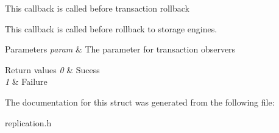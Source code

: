 This callback is called before transaction rollback

This callback is called before rollback to storage engines.


\begin{DoxyParams}{Parameters}
{\em param} & The parameter for transaction observers\\
\hline
\end{DoxyParams}

\begin{DoxyRetVals}{Return values}
{\em 0} & Sucess \\
\hline
{\em 1} & Failure \\
\hline
\end{DoxyRetVals}


The documentation for this struct was generated from the following file\+:\begin{DoxyCompactItemize}
\item 
replication.\+h\end{DoxyCompactItemize}
